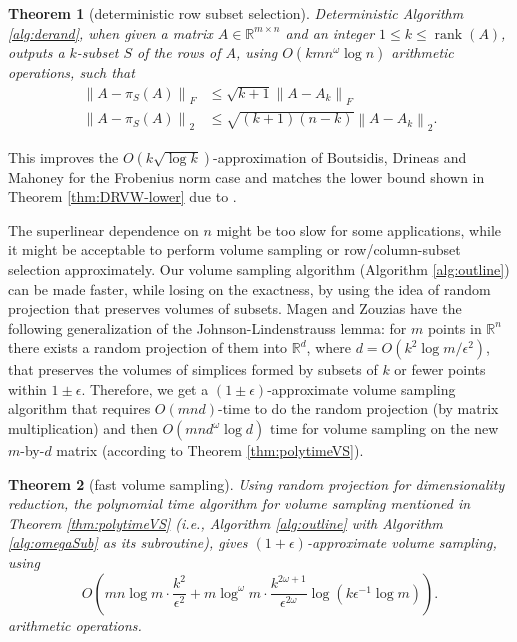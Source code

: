\documentclass[11pt]{article}
\newcommand{\rank}{\operatorname{rank}}
\newtheorem{theorem}{Theorem}
\def\reals{\mathbb{R}}
\def\eps{\epsilon}
\newcommand{\norm}[1]{\left\|#1\right\|}
\newcommand{\frob}[1]{\left\|#1\right\|_{F}}
\begin{document}
\begin{theorem}[deterministic row subset selection] \label{thm:det-sub-select}
Deterministic Algorithm \ref{alg:derand}, when given a matrix $A \in \reals^{m \times n}$ and an integer $1 \leq k \leq \rank(A)$, outputs a $k$-subset $S$ of the rows of $A$, using $O(kmn^{\omega} \log n)$ arithmetic operations, such that
\begin{align*}
\frob{A - \pi_{S}(A)} & \leq \sqrt{k+1} \frob{A - A_{k}} \\
\norm{A - \pi_{S}(A)}_{2} & \leq \sqrt{(k+1)(n-k)} \norm{A - A_{k}}_{2}.
\end{align*}
\end{theorem}
This improves the $O(k \sqrt{\log k})$-approximation of Boutsidis, Drineas and Mahoney \cite{BDM} for the Frobenius norm case and matches the lower bound shown in Theorem \ref{thm:DRVW-lower} due to \cite{DRVW}.

The superlinear dependence on $n$ might be too slow for some applications, while it might be acceptable to perform volume sampling or row/column-subset selection approximately. Our volume sampling algorithm (Algorithm \ref{alg:outline}) can be made faster, while losing on the exactness, by using the idea of random projection that preserves volumes of subsets. Magen and Zouzias \cite{MZ} have the following generalization of the Johnson-Lindenstrauss lemma: for $m$ points in $\reals^{n}$ there exists a random projection of them into $\reals^{d}$, where $d = O\left(k^{2} \log m / \eps^{2}\right)$, that preserves the volumes of simplices formed by subsets of $k$ or fewer points within $1\pm\eps$. Therefore, we get a $(1\pm\epsilon)$-approximate volume sampling algorithm that requires $O(mnd)$-time to do the random projection (by matrix multiplication) and then $O(mnd^{\omega} \log d)$ time for volume sampling on the new $m$-by-$d$ matrix (according to Theorem \ref{thm:polytimeVS}).

\begin{theorem}[fast volume sampling] \label{thm:fast-VS}
Using random projection for dimensionality reduction, the polynomial time algorithm for volume sampling mentioned in Theorem \ref{thm:polytimeVS} (i.e., Algorithm \ref{alg:outline} with Algorithm \ref{alg:omegaSub} as its subroutine), gives $(1+\eps)$-approximate volume sampling, using
\[
O\left(mn \log m \cdot \frac{k^{2}}{\eps^{2}} + m \log^{\omega} m \cdot \frac{k^{2\omega + 1}}{\eps^{2\omega}} \log(k \eps^{-1} \log m)\right).
\]
arithmetic operations.
\end{theorem}
\end{document}
